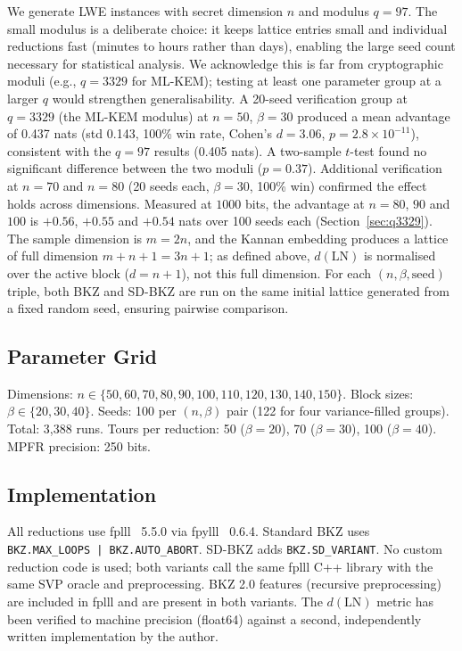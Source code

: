 \documentclass[journal=cic,version=preprint]{iacrj}
\begin{document}
We generate LWE instances with secret dimension $n$ and modulus $q=97$. The small modulus is a deliberate choice: it keeps lattice entries small and individual reductions fast (minutes to hours rather than days), enabling the large seed count necessary for statistical analysis. We acknowledge this is far from cryptographic moduli (e.g., $q=3329$ for ML-KEM); testing at least one parameter group at a larger $q$ would strengthen generalisability. A 20-seed verification group at $q=3329$ (the ML-KEM modulus) at $n=50$, $\beta=30$ produced a mean advantage of 0.437 nats (std 0.143, 100\% win rate, Cohen's $d=3.06$, $p=2.8\times 10^{-11}$), consistent with the $q=97$ results (0.405 nats). A two-sample $t$-test found no significant difference between the two moduli ($p=0.37$). Additional verification at $n=70$ and $n=80$ (20 seeds each, $\beta=30$, 100\% win) confirmed the effect holds across dimensions. Measured at $1000$ bits, the advantage at $n=80$, $90$ and $100$ is $+0.56$, $+0.55$ and $+0.54$ nats over 100 seeds each (Section~\ref{sec:q3329}). The sample dimension is $m=2n$, and the Kannan embedding produces a lattice of full dimension $m+n+1 = 3n+1$; as defined above, $d(\mathrm{LN})$ is normalised over the active block ($d=n+1$), not this full dimension. For each $(n, \beta, \mathrm{seed})$ triple, both BKZ and SD-BKZ are run on the same initial lattice generated from a fixed random seed, ensuring pairwise comparison.

\subsection{Parameter Grid}

\begin{sloppypar}
Dimensions: $n \in \{50, 60, 70, 80, 90, 100, 110, 120, 130, 140, 150\}$. Block sizes: $\beta \in \{20, 30, 40\}$. Seeds: 100 per $(n, \beta)$ pair (122 for four variance-filled groups). Total: 3{,}388 runs. Tours per reduction: 50 ($\beta=20$), 70 ($\beta=30$), 100 ($\beta=40$). MPFR precision: 250 bits.
\end{sloppypar}

\subsection{Implementation}

All reductions use fplll~\cite{fplll} 5.5.0 via fpylll~\cite{fpylll} 0.6.4. Standard BKZ uses \texttt{BKZ.MAX\_LOOPS\,|\,BKZ.AUTO\_ABORT}. SD-BKZ adds \texttt{BKZ.SD\_VARIANT}. No custom reduction code is used; both variants call the same fplll C++ library with the same SVP oracle and preprocessing. BKZ 2.0 features (recursive preprocessing) are included in fplll and are present in both variants. The $d(\mathrm{LN})$ metric has been verified to machine precision (float64) against a second, independently written implementation by the author.
\end{document}
